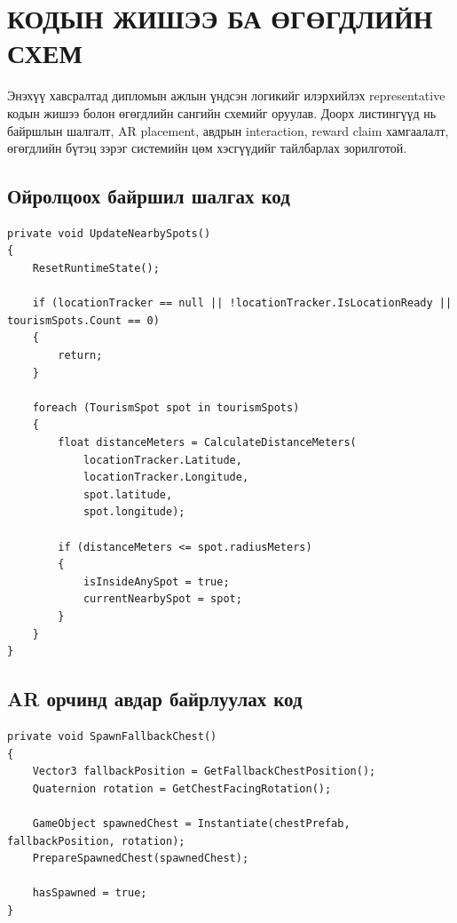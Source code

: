 \chapter{КОДЫН ЖИШЭЭ БА ӨГӨГДЛИЙН СХЕМ}
\begin{sloppy}

Энэхүү хавсралтад дипломын ажлын үндсэн логикийг илэрхийлэх representative кодын жишээ болон өгөгдлийн сангийн схемийг оруулав. Доорх листингүүд нь байршлын шалгалт, AR placement, авдрын interaction, reward claim хамгаалалт, өгөгдлийн бүтэц зэрэг системийн цөм хэсгүүдийг тайлбарлах зорилготой.

\section{Ойролцоох байршил шалгах код}

\begin{lstlisting}[language={[Sharp]C}, caption=TourismSpotManager - proximity шалгах үндсэн логик]
private void UpdateNearbySpots()
{
    ResetRuntimeState();

    if (locationTracker == null || !locationTracker.IsLocationReady || tourismSpots.Count == 0)
    {
        return;
    }

    foreach (TourismSpot spot in tourismSpots)
    {
        float distanceMeters = CalculateDistanceMeters(
            locationTracker.Latitude,
            locationTracker.Longitude,
            spot.latitude,
            spot.longitude);

        if (distanceMeters <= spot.radiusMeters)
        {
            isInsideAnySpot = true;
            currentNearbySpot = spot;
        }
    }
}
\end{lstlisting}

\section{AR орчинд авдар байрлуулах код}

\begin{lstlisting}[language={[Sharp]C}, caption=ARChestSpawner - fallback placement логик]
private void SpawnFallbackChest()
{
    Vector3 fallbackPosition = GetFallbackChestPosition();
    Quaternion rotation = GetChestFacingRotation();

    GameObject spawnedChest = Instantiate(chestPrefab, fallbackPosition, rotation);
    PrepareSpawnedChest(spawnedChest);

    hasSpawned = true;
}
\end{lstlisting}


\end{sloppy}
